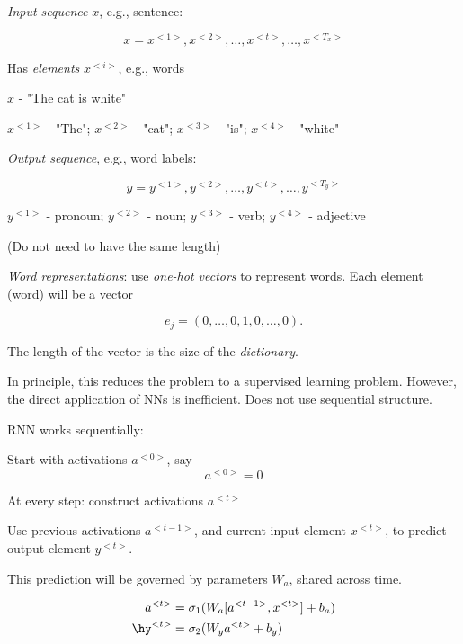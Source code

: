 \documentclass[english]{article}
\begin{document}
\item 

\emph{Input sequence} $x$, e.g., sentence:  

$$x = x^{<1>}, x^{<2>}, \ldots, x^{<t>}, \ldots, x^{<T_x>}$$

Has \emph{elements} $x^{<i>}$, e.g., words

\benum 
\item 
$x$ - "The cat is white"
\item  $x^{<1>}$ - "The"; $x^{<2>}$ - "cat"; $x^{<3>}$ - "is"; $x^{<4>}$ - "white"
\eenum 

\emph{Output sequence}, e.g., word labels: 

$$y = y^{<1>}, y^{<2>}, \ldots, y^{<t>}, \ldots, y^{<T_y>}$$
\benum 
\item  $y^{<1>}$ - pronoun; $y^{<2>}$ - noun; $y^{<3>}$ - verb; $y^{<4>}$ - adjective
\eenum 


(Do not need to have the same length)


\item \emph{Word representations}: use \emph{one-hot vectors} to represent words. Each element (word) will be a vector 

$$e_j = (0,\ldots, 0, 1, 0,\ldots, 0).$$ 

The length of the vector is the size of the \emph{dictionary}.

In principle, this reduces the problem to a supervised learning problem. However, the direct application of NNs is inefficient. Does not use sequential structure. 

\item RNN works sequentially: 

\benum 
\item 
Start with activations $a^{<0>}$, say 
$$a^{<0>}=0$$
\item 
At every step: construct activations $a^{<t>}$

Use previous activations $a^{<t-1>}$, and current input element $x^{<t>}$, to predict output element $y^{<t>}$. 

This prediction will be governed by parameters $W_{a}$, shared across time. 

\begin{align*}
a^{<t>} &= \sigma_1(W_{a}[a^{<t-1>},x^{<t>}]+b_a)\\
\hy^{<t>} &= \sigma_2(W_{y}a^{<t>}+b_y)
\end{align*}
\end{document}
